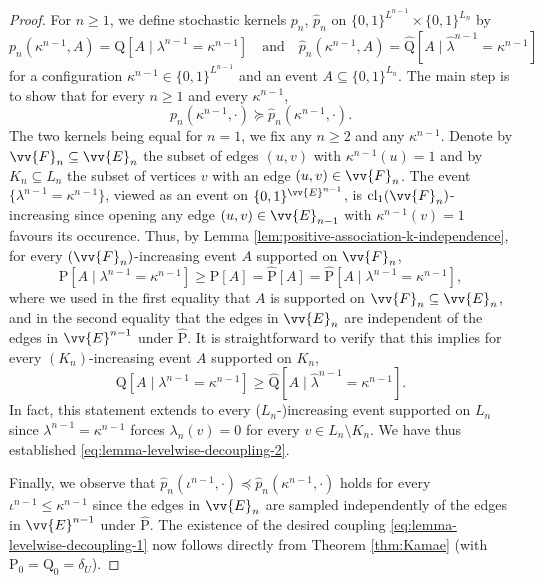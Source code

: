 \documentclass[11pt]{article}
\renewcommand{\P}{\mathrm{P}}
\DeclareMathOperator{\cl}{cl}
\theoremstyle{remark}
\begin{document}
\begin{proof}
	
	 For $n\ge 1$, we define stochastic kernels $p_n$, $\hat{p}_n$ on $\{0,1\}^{L^{n-1}} \times \{0,1\}^{L_n}$ by 
	\begin{equation}
		p_n(\kappa^{n-1},A) = \mathrm Q[A\mid \lambda^{n-1} = \kappa^{n-1} ] \quad \text{and} \quad \hat{p}_n(\kappa^{n-1},A) = \hat{\mathrm Q}[A\mid \hat{\lambda}^{n-1} = \kappa^{n-1} ]
	\end{equation}
	for a configuration $\kappa^{n-1} \in \{0,1\}^{L^{n-1}}$ and an event $A \subseteq \{0,1\}^{L_n}$. The main step is to show that for every $n\ge 1$ and  every $\kappa^{n-1}$,
	\begin{equation}\label{eq:lemma-levelwise-decoupling-2}
		  p_n(\kappa^{n-1},\boldsymbol{\cdot}) \succeq \hat{p}_n(\kappa^{n-1},\boldsymbol{\cdot}) .
	\end{equation}
	The two kernels being equal for $n=1$, we fix any $n \ge 2$ and any $\kappa^{n-1}$. Denote by $\vv{F}_n \subseteq \vv{E}_n$ the subset of edges $(u,v)$ with $\kappa^{n-1}(u)=1$ and by $K_n \subseteq L_n$ the subset of vertices $v$ with an edge $(u,v) \in \vv{F}_n$. 
	The event $\{\lambda^{n-1} = \kappa^{n-1}\}$, viewed as an event on $\{0,1\}^{\vv{E}^{n-1}}$, is $\cl_1(\vv{F}_n)$-increasing since opening any edge $(u,v) \in \vv{E}_{n-1}$ with $\kappa^{n-1}(v)=1$ favours its occurence. Thus, by Lemma \ref{lem:positive-association-k-independence}, for every $(\vv{F}_n)$-increasing event $A$ supported on $\vv{F}_n$, 
	\begin{equation}
		\P[A\mid \lambda^{n-1} = \kappa^{n-1} ] \ge  \P[A] = \hat{\P}[A]  =\hat{\P}[A\mid \lambda^{n-1} = \kappa^{n-1}],
	\end{equation} 
	where we used in the first equality that $A$ is supported on $\vv{F}_n\subseteq \vv{E}_n$, and in the second equality that the edges in $\vv{E}_n$ are independent of the edges in $\vv{E}^{n-1}$ under $\hat{\P}$. It is straightforward to verify that this implies for every $(K_n)$-increasing event $A$ supported on $K_n$, 
	\begin{equation}
		\mathrm Q[A\mid \lambda^{n-1} = \kappa^{n-1}] \ge \hat{\mathrm Q}[A\mid \hat{\lambda}^{n-1} = \kappa^{n-1} ].
	\end{equation}
	In fact, this statement extends to every ($L_n$-)increasing event supported on $L_n$ since $\lambda^{n-1} = \kappa^{n-1}$ forces $\lambda_n(v) = 0$ for every $v \in L_n \setminus K_n$. We have thus established \eqref{eq:lemma-levelwise-decoupling-2}. 
	
	Finally, we observe that 
	$\hat{p}_n(\iota^{n-1},\boldsymbol{\cdot}) \preceq \hat{p}_n(\kappa^{n-1},\boldsymbol{\cdot})$
	holds for every $\iota^{n-1} \le \kappa^{n-1}$ since the edges in $\vv{E}_n$ are sampled independently of the edges in $\vv{E}^{n-1}$ under $\hat{\P}$. The existence of the desired coupling \eqref{eq:lemma-levelwise-decoupling-1} now follows directly from Theorem \ref{thm:Kamae} (with $\P_0 = \mathrm{Q}_0 = \delta_U$).
\end{proof}
\end{document}
